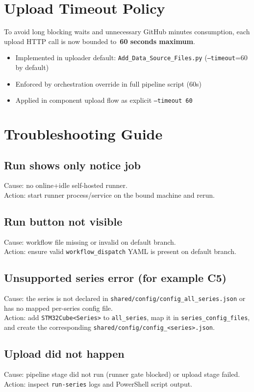 \documentclass[11pt,a4paper]{article}
\begin{document}
\section{Upload Timeout Policy}
To avoid long blocking waits and unnecessary GitHub minutes consumption, each upload HTTP call is now bounded to\
\textbf{60 seconds maximum}.

\begin{itemize}
  \item Implemented in uploader default: \texttt{Add\_Data\_Source\_Files.py} (\texttt{--timeout}=60 by default)
  \item Enforced by orchestration override in full pipeline script (60s)
  \item Applied in component upload flow as explicit \texttt{--timeout 60}
\end{itemize}

\section{Troubleshooting Guide}
\subsection{Run shows only notice job}
Cause: no online+idle self-hosted runner.\\
Action: start runner process/service on the bound machine and rerun.

\subsection{Run button not visible}
Cause: workflow file missing or invalid on default branch.\\
Action: ensure valid \texttt{workflow\_dispatch} YAML is present on default branch.

\subsection{Unsupported series error (for example C5)}
Cause: the series is not declared in \texttt{shared/config/config\_all\_series.json}
or has no mapped per-series config file.\\
Action: add \texttt{STM32Cube<Series>} to \texttt{all\_series}, map it in
\texttt{series\_config\_files}, and create the corresponding
\texttt{shared/config/config\_<series>.json}.

\subsection{Upload did not happen}
Cause: pipeline stage did not run (runner gate blocked) or upload stage failed.\\
Action: inspect \texttt{run-series} logs and PowerShell script output.
\end{document}

